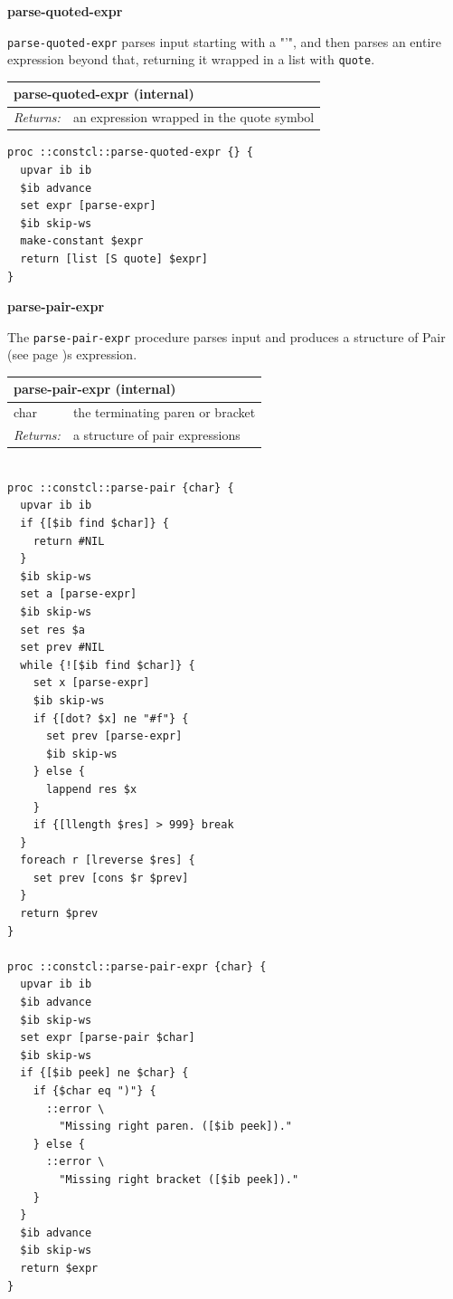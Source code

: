 \documentclass[twoside,9pt]{report}
\begin{document}
\textbf{parse-quoted-expr}


\texttt{parse-quoted-expr} parses input starting with a "'", and then parses an entire expression beyond that, returning it wrapped in a list with \texttt{quote}.

\begin{tabular}{ |l l| }
\hline
\multicolumn{2}{|l|}{parse-quoted-expr (internal)} \\
\hline
\textit{Returns:} & an expression wrapped in the quote symbol \\
\hline
\end{tabular}

\noindent\makebox[\linewidth]{\rule{\linewidth}{0.4pt}}
\begin{lstlisting}
proc ::constcl::parse-quoted-expr {} {
  upvar ib ib
  $ib advance
  set expr [parse-expr]
  $ib skip-ws
  make-constant $expr
  return [list [S quote] $expr]
}
\end{lstlisting}
\noindent\makebox[\linewidth]{\rule{\linewidth}{0.4pt}}

\textbf{parse-pair-expr}


The \texttt{parse-pair-expr} procedure parses input and produces a structure of Pair (see page \pageref{pairs-and-lists})s expression.

\begin{tabular}{ |l l| }
\hline
\multicolumn{2}{|l|}{parse-pair-expr (internal)} \\
\hline
char & the terminating paren or bracket \\
\textit{Returns:} & a structure of pair expressions \\
\hline
\end{tabular}

\noindent\makebox[\linewidth]{\rule{\linewidth}{0.4pt}}
\begin{lstlisting}
 
proc ::constcl::parse-pair {char} {
  upvar ib ib
  if {[$ib find $char]} {
    return #NIL
  }
  $ib skip-ws
  set a [parse-expr]
  $ib skip-ws
  set res $a
  set prev #NIL
  while {![$ib find $char]} {
    set x [parse-expr]
    $ib skip-ws
    if {[dot? $x] ne "#f"} {
      set prev [parse-expr]
      $ib skip-ws
    } else {
      lappend res $x
    }
    if {[llength $res] > 999} break
  }
  foreach r [lreverse $res] {
    set prev [cons $r $prev]
  }
  return $prev
}
 
proc ::constcl::parse-pair-expr {char} {
  upvar ib ib
  $ib advance
  $ib skip-ws
  set expr [parse-pair $char]
  $ib skip-ws
  if {[$ib peek] ne $char} {
    if {$char eq ")"} {
      ::error \
        "Missing right paren. ([$ib peek])."
    } else {
      ::error \
        "Missing right bracket ([$ib peek])."
    }
  }
  $ib advance
  $ib skip-ws
  return $expr
}
\end{lstlisting}
\noindent\makebox[\linewidth]{\rule{\linewidth}{0.4pt}}
\end{document}

